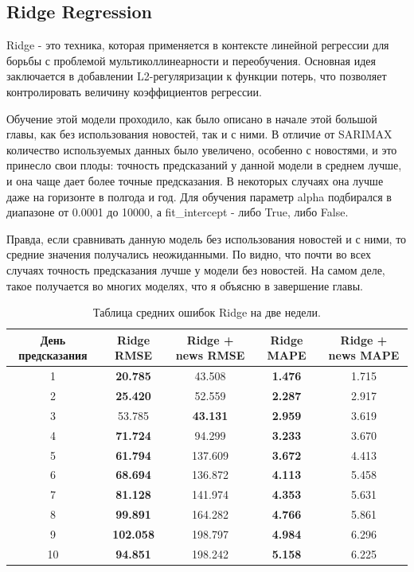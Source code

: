 \documentclass[12pt, a4paper]{article}
\begin{document}
\subsection{Ridge Regression}

Ridge - это техника, которая применяется в контексте линейной регрессии для борьбы с проблемой мультиколлинеарности и переобучения. Основная идея заключается в добавлении L2-регуляризации к функции потерь, что позволяет контролировать величину коэффициентов регрессии.

Обучение этой модели проходило, как было описано в начале этой большой главы, как без использования новостей, так и с ними. В отличие от SARIMAX количество используемых данных было увеличено, особенно с новостями, и это принесло свои плоды: точность предсказаний у данной модели в среднем лучше, и она чаще дает более точные предсказания. В некоторых случаях она лучше даже на горизонте в полгода и год. Для обучения параметр alpha подбирался в диапазоне от 0.0001 до 10000, а fit\_intercept - либо True, либо False.

Правда, если сравнивать данную модель без использования новостей и с ними, то средние значения получались неожиданными. По  видно, что почти во всех случаях точность предсказания лучше у модели без новостей. На самом деле, такое получается во многих моделях, что я объясню в завершение главы.
\begin{table}[H]
\centering
\caption{Таблица средних ошибок Ridge на две недели.}
\begin{tabular}{ |c|c|c|c|c| } 
 \hline
 День предсказания & Ridge RMSE & Ridge + news RMSE & Ridge MAPE & Ridge + news MAPE \\ 
 \hline
1 & \textbf{20.785} & 43.508 & \textbf{1.476} & 1.715 \\ 
 \hline
2 & \textbf{25.420} & 52.559 & \textbf{2.287} & 2.917 \\ 
 \hline
3 & 53.785 & \textbf{43.131} & \textbf{2.959} & 3.619 \\ 
 \hline
4 & \textbf{71.724} & 94.299 & \textbf{3.233} & 3.670 \\ 
 \hline
5 & \textbf{61.794} & 137.609 &\textbf{ 3.672} & 4.413 \\ 
 \hline
6 & \textbf{68.694} & 136.872 & \textbf{4.113} & 5.458 \\ 
 \hline
7 & \textbf{81.128} & 141.974 & \textbf{4.353} & 5.631 \\ 
 \hline
8 & \textbf{99.891} & 164.282 & \textbf{4.766} & 5.861 \\ 
 \hline
9 & \textbf{102.058} & 198.797 & \textbf{4.984} & 6.296 \\ 
 \hline
10 & \textbf{94.851} & 198.242 & \textbf{5.158} & 6.225 \\ 
 \hline
\end{tabular}
\label{tab:ridge}
\end{table}
\end{document}
